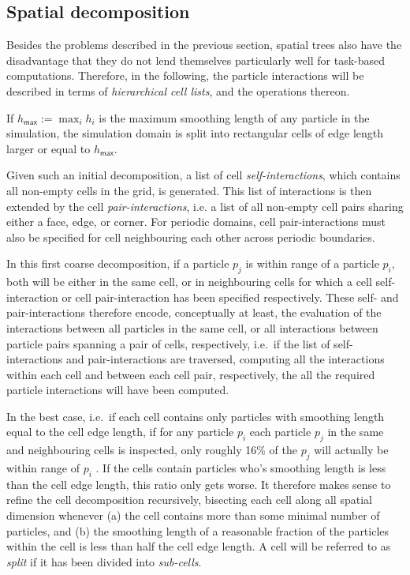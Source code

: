 \documentclass[final]{siamltex}
\begin{document}
\subsection{Spatial decomposition}

Besides the problems described in the previous section,
spatial trees also have the disadvantage that they do not
lend themselves particularly well for task-based computations.
Therefore, in the following, the particle interactions will be described in
terms of {\em hierarchical cell lists}, and the operations thereon.

If $h_\mathsf{max} := \max_i  h_i $ is the maximum smoothing
length of any particle in the simulation,  the simulation domain
is split into rectangular cells of edge length
larger or equal to $h_\mathsf{max}$.

Given such an initial decomposition,
a list of cell {\em self-interactions}, which contains all
non-empty cells in the grid, is generated.
This list of interactions is then extended by the cell
{\em pair-interactions}, i.e. a list of all non-empty cell pairs
sharing either a face, edge, or corner.
For periodic domains, cell pair-interactions must also be
specified for cell neighbouring each other across
periodic boundaries.

In this first coarse decomposition, if a particle $p_j$
is within range of a particle $p_i$, both will be either
in the same cell, or in neighbouring cells for which a
cell self-interaction or cell pair-interaction has been
specified respectively.
These self- and pair-interactions therefore encode,
conceptually at least,
the evaluation of the interactions between all particles
in the same cell, or all interactions between particle pairs
spanning a pair of cells, respectively, i.e.~if the list of
self-interactions and pair-interactions are traversed,
computing all the interactions within each cell and between
each cell pair, respectively, the all the required particle
interactions will have been computed.

In the best case, i.e.~if each cell contains
only particles with smoothing length equal to the cell
edge length, if for any particle $p_i$ each
particle $p_j$ in the same and neighbouring cells is
inspected, only roughly 16\% of the $p_j$
will actually be within range of $p_i$ \cite{ref:Gonnet2007}.
If the cells contain particles who's smoothing length
is less than the cell edge length, this ratio only
gets worse.
It therefore makes sense to refine the cell decomposition
recursively, bisecting each cell along
all spatial dimension whenever (a) the cell contains more than
some minimal number of particles, and (b) the smoothing
length of a reasonable fraction of the particles within
the cell is less than half the cell edge length.
A cell will be referred to as {\em split} if it
has been divided into {\em sub-cells}.
\end{document}
